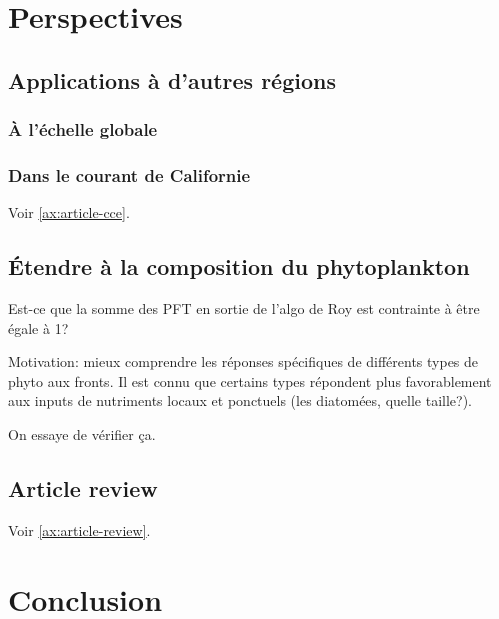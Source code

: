 
\chapter{Perspectives}
\label{chp:perspectives}

\minitoc%
\clearpage

\section{Applications à d'autres régions}
\label{sec:appl-autres-regions}

\subsection{À l'échelle globale}
\label{sec:global}

\subsection{Dans le courant de Californie}
\label{sec:CCE}

Voir \cref{ax:article-cce}.

\section{Étendre à la composition du phytoplankton}
\label{sec:persp-pft}

Est-ce que la somme des PFT en sortie de l'algo de Roy est contrainte à être égale à 1?

Motivation: mieux comprendre les réponses spécifiques de différents types de phyto aux fronts.
Il est connu que certains types répondent plus favorablement aux inputs de nutriments locaux et ponctuels (les diatomées, quelle taille?).

On essaye de vérifier ça.

\section{Article review}
Voir \cref{ax:article-review}.

\chapter{Conclusion}
\label{chp:conclusion}
